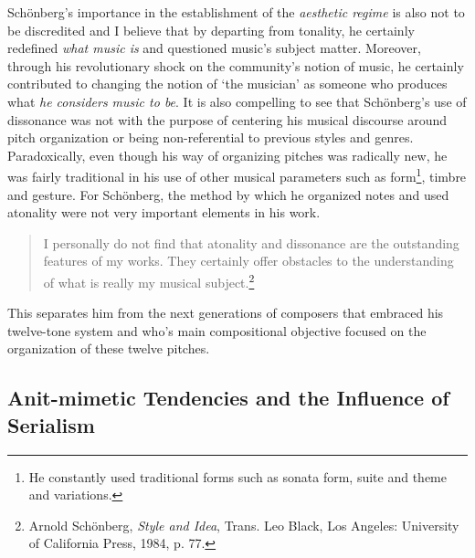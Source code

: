 Sch\"{o}nberg's importance in the establishment of the \emph{aesthetic regime} is also not to be discredited and I believe that by departing from tonality, he certainly redefined \emph{what music is} and questioned music's subject matter. Moreover, through his revolutionary shock on the community's notion of music, he certainly contributed to changing the notion of `the musician' as someone who produces what \emph{he considers music to be}. It is also compelling to see that Sch\"{o}nberg's use of dissonance was not with the purpose of centering his musical discourse around pitch organization or being non-referential to previous styles and genres. Paradoxically, even though his way of organizing pitches was radically new, he was fairly traditional in his use of other musical parameters such as form\footnote{He constantly used traditional forms such as sonata form, suite and theme and variations.}, timbre and gesture. For Sch\"{o}nberg, the method by which he organized notes and used atonality were not very important elements in his work.

\begin{quote}
I personally do not find that atonality and dissonance are the outstanding features of my works. They certainly offer obstacles to the understanding of what is really my musical subject.\footnote{Arnold Sch\"{o}nberg, \emph{Style and Idea}, Trans. Leo Black, Los Angeles: University of California Press, 1984, p. 77.}
\end{quote}
This separates him from the next generations of composers that embraced his twelve-tone system and who's main compositional objective focused on the organization of these twelve pitches. 

\subsection{Anit-mimetic Tendencies and the Influence of Serialism}

